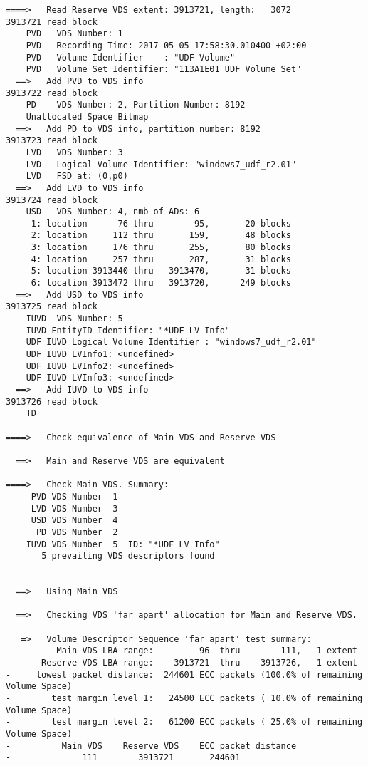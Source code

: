 \begin{lstlisting}
====>   Read Reserve VDS extent: 3913721, length:   3072
3913721 read block
    PVD   VDS Number: 1
    PVD   Recording Time: 2017-05-05 17:58:30.010400 +02:00
    PVD   Volume Identifier    : "UDF Volume"
    PVD   Volume Set Identifier: "113A1E01 UDF Volume Set"
  ==>   Add PVD to VDS info
3913722 read block
    PD    VDS Number: 2, Partition Number: 8192
    Unallocated Space Bitmap
  ==>   Add PD to VDS info, partition number: 8192
3913723 read block
    LVD   VDS Number: 3
    LVD   Logical Volume Identifier: "windows7_udf_r2.01"
    LVD   FSD at: (0,p0)
  ==>   Add LVD to VDS info
3913724 read block
    USD   VDS Number: 4, nmb of ADs: 6
     1: location      76 thru        95,       20 blocks
     2: location     112 thru       159,       48 blocks
     3: location     176 thru       255,       80 blocks
     4: location     257 thru       287,       31 blocks
     5: location 3913440 thru   3913470,       31 blocks
     6: location 3913472 thru   3913720,      249 blocks
  ==>   Add USD to VDS info
3913725 read block
    IUVD  VDS Number: 5
    IUVD EntityID Identifier: "*UDF LV Info"
    UDF IUVD Logical Volume Identifier : "windows7_udf_r2.01"
    UDF IUVD LVInfo1: <undefined>
    UDF IUVD LVInfo2: <undefined>
    UDF IUVD LVInfo3: <undefined>
  ==>   Add IUVD to VDS info
3913726 read block
    TD  

====>   Check equivalence of Main VDS and Reserve VDS

  ==>   Main and Reserve VDS are equivalent

====>   Check Main VDS. Summary:
     PVD VDS Number  1
     LVD VDS Number  3
     USD VDS Number  4
      PD VDS Number  2
    IUVD VDS Number  5  ID: "*UDF LV Info"
       5 prevailing VDS descriptors found


  ==>   Using Main VDS

  ==>   Checking VDS 'far apart' allocation for Main and Reserve VDS.

   =>   Volume Descriptor Sequence 'far apart' test summary:
-         Main VDS LBA range:         96  thru        111,   1 extent
-      Reserve VDS LBA range:    3913721  thru    3913726,   1 extent
-     lowest packet distance:  244601 ECC packets (100.0% of remaining Volume Space)
-        test margin level 1:   24500 ECC packets ( 10.0% of remaining Volume Space)
-        test margin level 2:   61200 ECC packets ( 25.0% of remaining Volume Space)
-          Main VDS    Reserve VDS    ECC packet distance
-              111        3913721       244601                      



\end{lstlisting}
